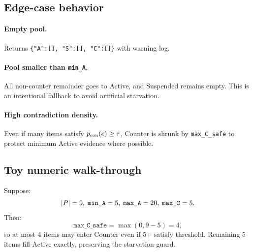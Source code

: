 \subsection{Edge-case behavior}
\paragraph{Empty pool.}
Returns \texttt{\{"A":[], "S":[], "C":[]\}} with warning log.

\paragraph{Pool smaller than \texttt{min\_A}.}
All non-counter remainder goes to Active, and Suspended remains empty.
This is an intentional fallback to avoid artificial starvation.

\paragraph{High contradiction density.}
Even if many items satisfy $p_{\mathrm{con}}(e)\ge\tau$, Counter is shrunk by
\texttt{max\_C\_safe} to protect minimum Active evidence where possible.

\subsection{Toy numeric walk-through}
Suppose:
\begin{equation}
|P|=9,\;\texttt{min\_A}=5,\;\texttt{max\_A}=20,\;\texttt{max\_C}=5.
\end{equation}
Then:
\begin{equation}
\texttt{max\_C\_safe}=\max(0,9-5)=4,
\end{equation}
so at most 4 items may enter Counter even if 5+ satisfy threshold.
Remaining 5 items fill Active exactly, preserving the starvation guard.
